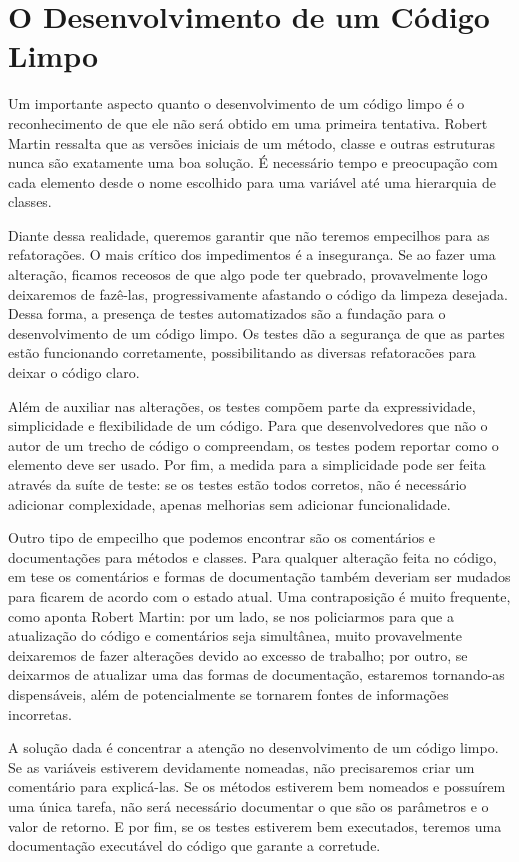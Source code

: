 \section{O Desenvolvimento de um Código Limpo} 
Um importante aspecto quanto o desenvolvimento de um código limpo é o reconhecimento de que ele não será obtido em uma primeira tentativa. Robert 
Martin ressalta que as versões iniciais de um método, classe e outras estruturas nunca são exatamente uma boa solução. É necessário tempo e 
preocupação com cada elemento desde o nome escolhido para uma variável até uma hierarquia de classes.

Diante dessa realidade, queremos garantir que não teremos empecilhos para as refatorações.
O mais crítico dos impedimentos é a insegurança. Se ao fazer uma alteração, ficamos receosos de que algo pode ter quebrado, provavelmente logo 
deixaremos de fazê-las, progressivamente afastando o código da limpeza desejada. Dessa forma, a presença de testes automatizados são a fundação 
para o desenvolvimento de um código limpo. Os testes dão a segurança de que as partes estão funcionando corretamente, possibilitando as diversas 
refatoracões para deixar o código claro.

Além de auxiliar nas alterações, os testes compõem parte da expressividade, simplicidade e flexibilidade de um código. Para que desenvolvedores 
que não o autor de um trecho de código o compreendam, os testes podem reportar como o elemento deve ser usado. Por fim, a medida para a 
simplicidade pode ser feita através da suíte de teste: se os testes estão todos corretos, não é necessário adicionar complexidade, apenas 
melhorias sem adicionar funcionalidade. 

Outro tipo de empecilho que podemos encontrar são os comentários e documentações para métodos e classes. Para qualquer alteração feita no código, 
em tese os comentários e formas de documentação também deveriam ser mudados para ficarem de acordo com o estado atual. Uma contraposição é muito 
frequente, como aponta Robert Martin: por um lado, se nos policiarmos para que a atualização do código e comentários seja simultânea, muito 
provavelmente deixaremos de fazer alterações devido ao excesso de trabalho; por outro, se deixarmos de atualizar uma das formas de documentação, 
estaremos tornando-as dispensáveis, além de potencialmente se tornarem fontes de informações incorretas.

A solução dada é concentrar a atenção no desenvolvimento de um código limpo. Se as variáveis estiverem devidamente nomeadas, não precisaremos 
criar um comentário para explicá-las. Se os métodos estiverem bem nomeados e possuírem uma única tarefa, não será necessário documentar o que são 
os parâmetros e o valor de retorno. E por fim, se os testes estiverem bem executados, teremos uma documentação executável do código que garante a 
corretude.

